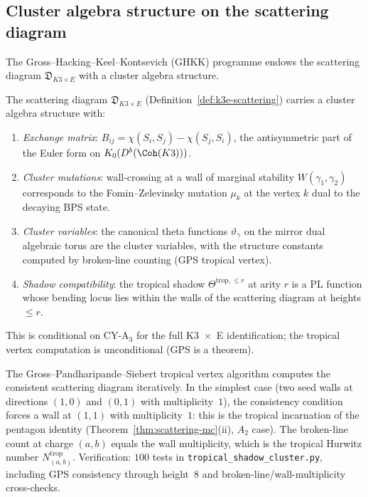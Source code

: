 \subsection{Cluster algebra structure on the scattering diagram}
\label{subsec:tropical-cluster}

The Gross--Hacking--Keel--Kontsevich (GHKK) programme endows the scattering diagram $\mathfrak{D}_{K3 \times E}$ with a cluster algebra structure.

\begin{conjecture}
\label{conj:cluster-shadow}
\ClaimStatusConjectured
The scattering diagram $\mathfrak{D}_{K3 \times E}$ \textup{(}Definition~\textup{\ref{def:k3e-scattering})} carries a cluster algebra structure with:
\begin{enumerate}[label=\textup{(\roman*)}]
\item \emph{Exchange matrix}: $B_{ij} = \chi(S_i, S_j) - \chi(S_j, S_i)$, the antisymmetric part of the Euler form on $K_0(D^b(\Coh(K3)))$.
\item \emph{Cluster mutations}: wall-crossing at a wall of marginal stability $W(\gamma_1, \gamma_2)$ corresponds to the Fomin--Zelevinsky mutation $\mu_k$ at the vertex $k$ dual to the decaying BPS state.
\item \emph{Cluster variables}: the canonical theta functions $\vartheta_\gamma$ on the mirror dual algebraic torus are the cluster variables, with the structure constants computed by broken-line counting \textup{(}GPS tropical vertex\textup{)}.
\item \emph{Shadow compatibility}: the tropical shadow $\Theta^{\mathrm{trop},\leq r}$ at arity $r$ is a PL function whose bending locus lies within the walls of the scattering diagram at heights $\leq r$.
\end{enumerate}
This is conditional on CY-A$_3$ for the full K3~$\times$~E identification; the tropical vertex computation is unconditional \textup{(}GPS is a theorem\textup{)}.
\end{conjecture}

\begin{remark}
\label{rem:gps-pentagon}
The Gross--Pandharipande--Siebert tropical vertex algorithm computes the consistent scattering diagram iteratively.  In the simplest case \textup{(}two seed walls at directions $(1,0)$ and $(0,1)$ with multiplicity~$1$\textup{)}, the consistency condition forces a wall at $(1,1)$ with multiplicity~$1$: this is the tropical incarnation of the pentagon identity \textup{(}Theorem~\textup{\ref{thm:scattering-mc}(ii)}, $A_2$ case\textup{)}.  The broken-line count at charge $(a,b)$ equals the wall multiplicity, which is the tropical Hurwitz number $N_{(a,b)}^{\mathrm{trop}}$.  Verification: $100$ tests in \texttt{tropical\_shadow\_cluster.py}, including GPS consistency through height~$8$ and broken-line/wall-multiplicity cross-checks.
\end{remark}

